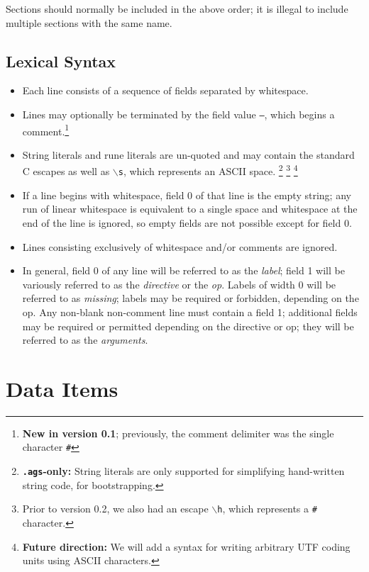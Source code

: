 \documentclass{report}
\newcommand\bs{$\backslash$}
\newcommand\stringcode[1]{\texttt{#1}}
\newcommand\agsonly[1]{\footnote{\textbf{\texttt{.ags}-only: }#1}}
\newcommand\old[2]{\footnote{Prior to version #1, #2}}
\newcommand\new[2]{\footnote{\textbf{New in version #1}; previously, #2}}
\newcommand\future[1]{\footnote{\textbf{Future direction:} #1}}
\begin{document}
Sections should normally be included in the above order;
it is illegal to include multiple sections with the same name.

\section{Lexical Syntax}

\begin{itemize}
    \item Each line consists of a sequence of fields separated by whitespace.

    \item Lines may optionally be terminated by the field value \stringcode{--}, which begins a comment.\new{0.1}{the comment delimiter was the single character \stringcode{\#}}

    \item String literals and rune literals are un-quoted and may contain the standard C escapes as well as
        \stringcode{\bs{}s}, which represents an ASCII space.
        \agsonly{String literals are only supported for simplifying hand-written string code, for bootstrapping.}
        \old{0.2}{we also had an escape \stringcode{\bs{}h}, which represents a \stringcode{\#} character.}
        \future{We will add a syntax for writing arbitrary UTF coding units using ASCII characters.}

    \item If a line begins with whitespace, field 0 of that line is the empty string;
        any run of linear whitespace is equivalent to a single space and whitespace at the end of the line is ignored,
        so empty fields are not possible except for field 0.

    \item Lines consisting exclusively of whitespace and/or comments are ignored.

    \item In general, field 0 of any line will be referred to as the \emph{label};
        field 1 will be variously referred to as the \emph{directive} or the \emph{op}.
        Labels of width 0 will be referred to as \emph{missing};
        labels may be required or forbidden, depending on the op.
        Any non-blank non-comment line must contain a field 1;
        additional fields may be required or permitted depending on the directive or op;
        they will be referred to as the \emph{arguments}.
\end{itemize}

\chapter{Data Items}
\end{document}
